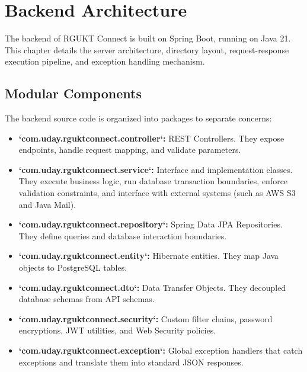 \chapter{Backend Architecture}
\label{ch:backend}

The backend of RGUKT Connect is built on Spring Boot, running on Java 21. This chapter details the server architecture, directory layout, request-response execution pipeline, and exception handling mechanism.

\section{Modular Components}
The backend source code is organized into packages to separate concerns:
\begin{itemize}
    \item \textbf{`com.uday.rguktconnect.controller`:} REST Controllers. They expose endpoints, handle request mapping, and validate parameters.
    \item \textbf{`com.uday.rguktconnect.service`:} Interface and implementation classes. They execute business logic, run database transaction boundaries, enforce validation constraints, and interface with external systems (such as AWS S3 and Java Mail).
    \item \textbf{`com.uday.rguktconnect.repository`:} Spring Data JPA Repositories. They define queries and database interaction boundaries.
    \item \textbf{`com.uday.rguktconnect.entity`:} Hibernate entities. They map Java objects to PostgreSQL tables.
    \item \textbf{`com.uday.rguktconnect.dto`:} Data Transfer Objects. They decoupled database schemas from API schemas.
    \item \textbf{`com.uday.rguktconnect.security`:} Custom filter chains, password encryptions, JWT utilities, and Web Security policies.
    \item \textbf{`com.uday.rguktconnect.exception`:} Global exception handlers that catch exceptions and translate them into standard JSON responses.
\end{itemize}

